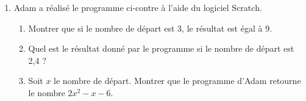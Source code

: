 \begin{minipage}{9cm}
\begin{enumerate}
\item Adam a réalisé le programme ci-contre à l’aide du logiciel Scratch.
\begin{enumerate}
	\item Montrer que si le nombre de départ est 3, le résultat est égal à 9.
	\item Quel est le résultat donné par le programme si le nombre de départ est 2,4 ?
	\item Soit $x$ le nombre de départ. Montrer que le programme d’Adam retourne le nombre $2x^2 - x - 6$.
\end{enumerate}
\end{enumerate}
\end{minipage}
\hfill
\begin{minipage}{9cm}
\begin{scratch}[scale=0.75,print]
							        
\end{scratch}
\end{minipage}

